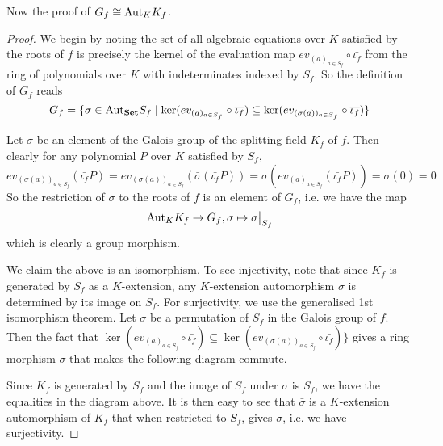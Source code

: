 \documentclass[../book.tex]{subfiles}
\begin{document}
Now the proof of $G_f \cong \mathrm{Aut}_{K}K_f$.  

\begin{proof} 
    
    We begin by noting 
    the set of all algebraic equations over $K$ satisfied by the roots of $f$ 
    is precisely the kernel of the evaluation map $ev_{(a)_{a\in S_f}}\circ\bar{\iota_f}$
    from the ring of polynomials over $K$ with indeterminates indexed by $S_f$. 
    So the definition of $G_f$ reads \[
        G_f = \{ \sigma \in \mathrm{Aut}_{\mathbf{Set}}S_f \mid 
        \ker (ev_{(a)_{a\in S_f}} \circ \overline{\iota_f}) \subseteq 
        \ker (ev_{(\sigma(a))_{a\in S_f}}\circ \overline{\iota_f} )\}
    \]
    
    Let $\sigma$ be an element of the Galois group of the splitting field $K_f$ of $f$. 
    Then clearly for any polynomial $P$ over $K$ satisfied by $S_f$, \[
        ev_{(\sigma(a))_{a\in S_f}} (\bar{\iota_f} P) 
        = ev_{(\sigma(a))_{a\in S_f}} ( \bar{\sigma}(\bar{\iota_f} P) )
        = \sigma (ev_{(a)_{a\in S_f}} (\bar{\iota_f} P))
        = \sigma (0) = 0
    \]
    So the restriction of $\sigma$ to the roots of $f$ is an element of $G_f$,
    i.e. we have the map \[
        \aut{K}{K_f} \to G_f, \sigma \mapsto \res{\sigma}{S_f}
    \]
    which is clearly a group morphism. 
    
    We claim the above is an isomorphism. 
    To see injectivity, 
    note that since $K_f$ is generated by $S_f$ as a $K$-extension, 
    any $K$-extension automorphism $\sigma$ is determined by its image on $S_f$. 
    For surjectivity, we use the generalised 1st isomorphism theorem. 
    Let $\sigma$ be a permutation of $S_f$ in the Galois group of $f$. 
    Then the fact that 
    $\ker (ev_{(a)_{a\in S_f}} \circ \bar{\iota_f}) \subseteq 
    \ker (ev_{(\sigma(a))_{a\in S_f}}\circ \bar{\iota_f} )\}$
    gives a ring morphism $\bar{\sigma}$ that makes the following diagram commute.
    \begin{figure} [H]
        \centering
    \end{figure}
    Since $K_f$ is generated by $S_f$ and the image of $S_f$ under $\sigma$ is $S_f$,
    we have the equalities in the diagram above. 
    It is then easy to see that $\bar{\sigma}$ is a $K$-extension automorphism
    of $K_f$ that when restricted to $S_f$, gives $\sigma$,
    i.e. we have surjectivity. 
    
\end{proof}
\end{document}
